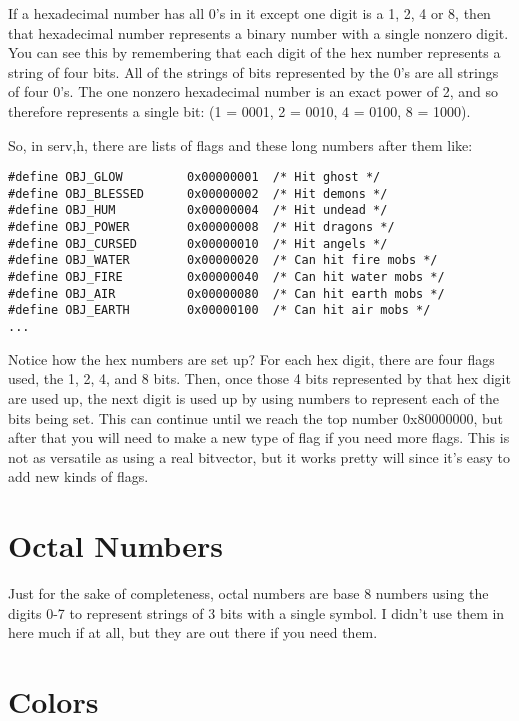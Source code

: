 If a hexadecimal number has all 0's in it except one digit is a 1, 2,
4 or 8, then that hexadecimal number represents a binary number with a
single nonzero digit. You can see this by remembering that each digit
of the hex number represents a string of four bits. All of the strings
of bits represented by the 0's are all strings of four 0's. The one
nonzero hexadecimal number is an exact power of 2, and so therefore
represents a single bit: (1 = 0001, 2 = 0010, 4 = 0100, 8 = 1000).


So, in serv,h, there are lists of flags and these long numbers after them like:

\begin{verbatim}
#define OBJ_GLOW         0x00000001  /* Hit ghost */
#define OBJ_BLESSED      0x00000002  /* Hit demons */
#define OBJ_HUM          0x00000004  /* Hit undead */
#define OBJ_POWER        0x00000008  /* Hit dragons */
#define OBJ_CURSED       0x00000010  /* Hit angels */
#define OBJ_WATER        0x00000020  /* Can hit fire mobs */
#define OBJ_FIRE         0x00000040  /* Can hit water mobs */
#define OBJ_AIR          0x00000080  /* Can hit earth mobs */
#define OBJ_EARTH        0x00000100  /* Can hit air mobs */
...
\end{verbatim}

Notice how the hex numbers are set up? For each hex digit, there are
four flags used, the 1, 2, 4, and 8 bits. Then, once those 4 bits represented
by that hex digit are used up, the next digit is used up by using 
numbers to represent each of the bits being set. This can continue
until we reach the top number 0x80000000, but after that you will
need to make a new type of flag if you need more flags. This is not 
as versatile as using a real bitvector, but it works pretty will
since it's easy to add new kinds of flags.

\section{Octal Numbers}

Just for the sake of completeness, octal numbers are base 8 numbers using
the digits 0-7 to represent strings of 3 bits with a single
symbol. I didn't use them in here much if at all, but they are out
there if you need them.

\section{Colors}

